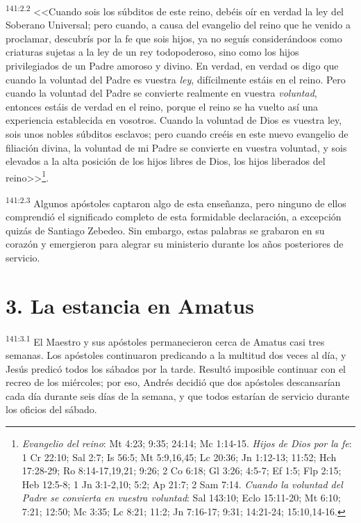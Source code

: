 \par 
\textsuperscript{141:2.2} <<Cuando sois los súbditos de este reino, debéis oír en verdad la ley del Soberano Universal; pero cuando, a causa del evangelio del reino que he venido a proclamar, descubrís por la fe que sois hijos, ya no seguís considerándoos como criaturas sujetas a la ley de un rey todopoderoso, sino como los hijos privilegiados de un Padre amoroso y divino. En verdad, en verdad os digo que cuando la voluntad del Padre es vuestra \textit{ley}, difícilmente estáis en el reino. Pero cuando la voluntad del Padre se convierte realmente en vuestra \textit{voluntad}, entonces estáis de verdad en el reino, porque el reino se ha vuelto así una experiencia establecida en vosotros. Cuando la voluntad de Dios es vuestra ley, sois unos nobles súbditos esclavos; pero cuando creéis en este nuevo evangelio de filiación divina, la voluntad de mi Padre se convierte en vuestra voluntad, y sois elevados a la alta posición de los hijos libres de Dios, los hijos liberados del reino>>\footnote{\textit{Evangelio del reino}: Mt 4:23; 9:35; 24:14; Mc 1:14-15. \textit{Hijos de Dios por la fe}: 1 Cr 22:10; Sal 2:7; Is 56:5; Mt 5:9,16,45; Lc 20:36; Jn 1:12-13; 11:52; Hch 17:28-29; Ro 8:14-17,19,21; 9:26; 2 Co 6:18; Gl 3:26; 4:5-7; Ef 1:5; Flp 2:15; Heb 12:5-8; 1 Jn 3:1-2,10; 5:2; Ap 21:7; 2 Sam 7:14. \textit{Cuando la voluntad del Padre se convierta en vuestra voluntad}: Sal 143:10; Eclo 15:11-20; Mt 6:10; 7:21; 12:50; Mc 3:35; Lc 8:21; 11:2; Jn 7:16-17; 9:31; 14:21-24; 15:10,14-16.}.

\par 
\textsuperscript{141:2.3} Algunos apóstoles captaron algo de esta enseñanza, pero ninguno de ellos comprendió el significado completo de esta formidable declaración, a excepción quizás de Santiago Zebedeo. Sin embargo, estas palabras se grabaron en su corazón y emergieron para alegrar su ministerio durante los años posteriores de servicio.

\section*{3. La estancia en Amatus}
\par 
\textsuperscript{141:3.1} El Maestro y sus apóstoles permanecieron cerca de Amatus casi tres semanas. Los apóstoles continuaron predicando a la multitud dos veces al día, y Jesús predicó todos los sábados por la tarde. Resultó imposible continuar con el recreo de los miércoles; por eso, Andrés decidió que dos apóstoles descansarían cada día durante seis días de la semana, y que todos estarían de servicio durante los oficios del sábado.

